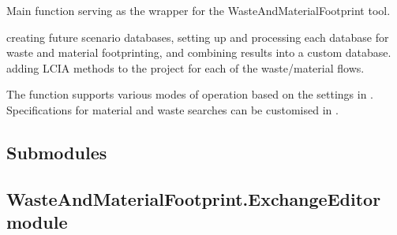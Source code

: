 \documentclass[letterpaper,10pt,english]{sphinxmanual}
\begin{document}

\begin{fulllineitems}
\label{\detokenize{WMFootprint_api:WasteAndMaterialFootprint.main.run}}
\pysigstartsignatures
{}
\pysigstopsignatures
\sphinxAtStartPar
Main function serving as the wrapper for the WasteAndMaterialFootprint tool.
\begin{description}
\sphinxAtStartPar
creating future scenario databases,
setting up and processing each database for waste and material footprinting,
and combining results into a custom database.
adding LCIA methods to the project for each of the waste/material flows.

\end{description}

\sphinxAtStartPar
The function supports various modes of operation based on the settings in .
Specifications for material and waste searches can be customised in .

\end{fulllineitems}



\subsection{Submodules}
\label{\detokenize{WMFootprint_api:submodules}}

\subsection{WasteAndMaterialFootprint.ExchangeEditor module}
\label{\detokenize{WMFootprint_api:module-WasteAndMaterialFootprint.ExchangeEditor}}\label{\detokenize{WMFootprint_api:wasteandmaterialfootprint-exchangeeditor-module}}
\end{document}
